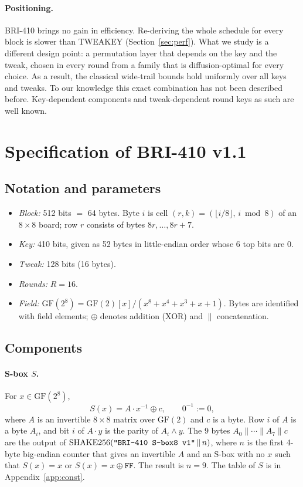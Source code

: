 \documentclass[11pt,a4paper]{article}
\newcommand{\GF}{\mathrm{GF}}
\newcommand{\shake}{\mathrm{SHAKE256}}
\newcommand{\str}[1]{\text{\texttt{"#1"}}}
\newcommand{\hx}[1]{\mathtt{#1}}
\begin{document}
\paragraph{Positioning.} BRI-410 brings no gain in efficiency. Re-deriving the whole schedule for every block
is slower than TWEAKEY (Section~\ref{sec:perf}). What we study is a different design point: a permutation layer
that depends on the key and the tweak, chosen in every round from a family that is diffusion-optimal for every
choice. As a result, the classical wide-trail bounds hold uniformly over all keys and tweaks. To our knowledge
this exact combination has not been described before. Key-dependent components and tweak-dependent round keys
as such are well known.

\section{Specification of BRI-410 v1.1}\label{sec:spec}

\subsection{Notation and parameters}

\begin{itemize}
\item \emph{Block:} 512 bits $=$ 64 bytes. Byte $i$ is cell $(r,k) = (\lfloor i/8\rfloor,\, i \bmod 8)$ of an
  $8\times 8$ board; row $r$ consists of bytes $8r,\dots,8r+7$.
\item \emph{Key:} 410 bits, given as 52 bytes in little-endian order whose 6 top bits are $0$.
\item \emph{Tweak:} 128 bits (16 bytes).
\item \emph{Rounds:} $R = 16$.
\item \emph{Field:} $\GF(2^8) = \GF(2)[x]/(x^8 + x^4 + x^3 + x + 1)$. Bytes are identified with field elements;
  $\oplus$ denotes addition (XOR) and $\|$ concatenation.
\end{itemize}

\subsection{Components}

\paragraph{S-box $S$.} For $x \in \GF(2^8)$,
\[
  S(x) = A\cdot x^{-1} \oplus c, \qquad 0^{-1} := 0,
\]
where $A$ is an invertible $8\times 8$ matrix over $\GF(2)$ and $c$ is a byte. Row $i$ of $A$ is a byte $A_i$,
and bit $i$ of $A\cdot y$ is the parity of $A_i \wedge y$. The 9 bytes $A_0\|\cdots\|A_7\|c$ are the output of
$\shake(\str{BRI-410 S-box8 v1} \,\|\, n)$, where $n$ is the first 4-byte big-endian counter that gives an
invertible $A$ and an S-box with no $x$ such that $S(x) = x$ or $S(x) = x \oplus \hx{FF}$. The result is $n=9$.
The table of $S$ is in Appendix~\ref{app:const}.
\end{document}
